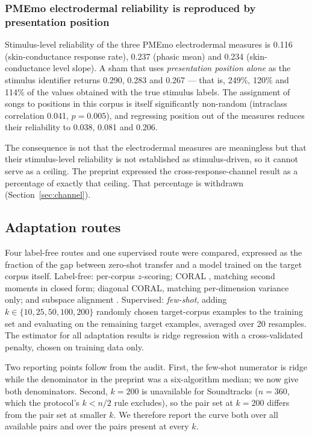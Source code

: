 \subsubsection{PMEmo electrodermal reliability is reproduced by presentation
position}

Stimulus-level reliability of the three PMEmo electrodermal measures is 0.116
(skin-conductance response rate), 0.237 (phasic mean) and 0.234
(skin-conductance level slope). A sham that uses \emph{presentation position
alone} as the stimulus identifier returns 0.290, 0.283 and 0.267 --- that is,
249\%, 120\% and 114\% of the values obtained with the true stimulus labels.
The assignment of songs to positions in this corpus is itself significantly
non-random (intraclass correlation 0.041, $p = 0.005$), and regressing
position out of the measures reduces their reliability to 0.038, 0.081 and
0.206.

The consequence is not that the electrodermal measures are meaningless but
that their stimulus-level reliability is not established as stimulus-driven,
so it cannot serve as a ceiling. The preprint expressed the
cross-response-channel result as a percentage of exactly that ceiling. That
percentage is withdrawn (Section~\ref{sec:channel}).

\subsection{Adaptation routes}

Four label-free routes and one supervised route were compared, expressed as
the fraction of the gap between zero-shot transfer and a model trained on the
target corpus itself. Label-free: per-corpus $z$-scoring; CORAL
\cite{sun2016coral}, matching second moments in closed form; diagonal CORAL,
matching per-dimension variance only; and subspace alignment
\cite{fernando2013subspace}. Supervised: \emph{few-shot}, adding $k \in
\{10, 25, 50, 100, 200\}$ randomly chosen target-corpus examples to the
training set and evaluating on the remaining target examples, averaged over 20
resamples. The estimator for all adaptation results is ridge regression with a
cross-validated penalty, chosen on training data only.

Two reporting points follow from the audit. First, the few-shot numerator is
ridge while the denominator in the preprint was a six-algorithm median; we now
give both denominators. Second, $k = 200$ is unavailable for Soundtracks
($n = 360$, which the protocol's $k < n/2$ rule excludes), so the pair set at
$k = 200$ differs from the pair set at smaller $k$. We therefore report the
curve both over all available pairs and over the pairs present at every $k$.

